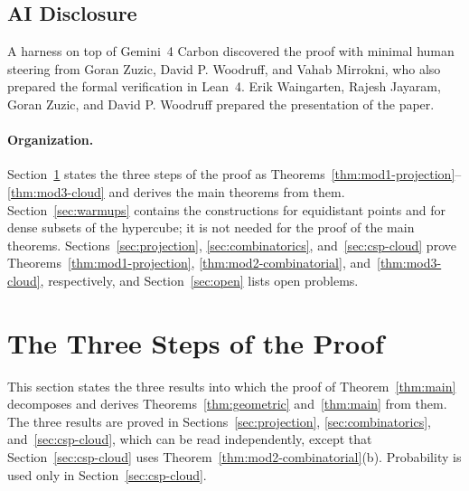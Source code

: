 \documentclass[11pt]{article}
\theoremstyle{definition}
\theoremstyle{remark}
\begin{document}
\subsection{AI Disclosure}
\label{subsec:ai-disclosure}

A harness on top of Gemini~4 Carbon discovered the proof with minimal human steering from Goran Zuzic, David P. Woodruff, and Vahab Mirrokni, who also prepared the formal verification in Lean~4. Erik Waingarten, Rajesh Jayaram, Goran Zuzic, and David P. Woodruff prepared the presentation of the paper.

\paragraph{Organization.}
Section~\ref{sec:overview} states the three steps of the proof as Theorems~\ref{thm:mod1-projection}--\ref{thm:mod3-cloud} and derives the main theorems from them. Section~\ref{sec:warmups} contains the constructions for equidistant points and for dense subsets of the hypercube; it is not needed for the proof of the main theorems. Sections~\ref{sec:projection}, \ref{sec:combinatorics}, and~\ref{sec:csp-cloud} prove Theorems~\ref{thm:mod1-projection}, \ref{thm:mod2-combinatorial}, and~\ref{thm:mod3-cloud}, respectively, and Section~\ref{sec:open} lists open problems.


\section{The Three Steps of the Proof}
\label{sec:overview}

This section states the three results into which the proof of Theorem~\ref{thm:main} decomposes and derives Theorems~\ref{thm:geometric} and~\ref{thm:main} from them. The three results are proved in Sections~\ref{sec:projection}, \ref{sec:combinatorics}, and~\ref{sec:csp-cloud}, which can be read independently, except that Section~\ref{sec:csp-cloud} uses Theorem~\ref{thm:mod2-combinatorial}(b). Probability is used only in Section~\ref{sec:csp-cloud}.
\end{document}
